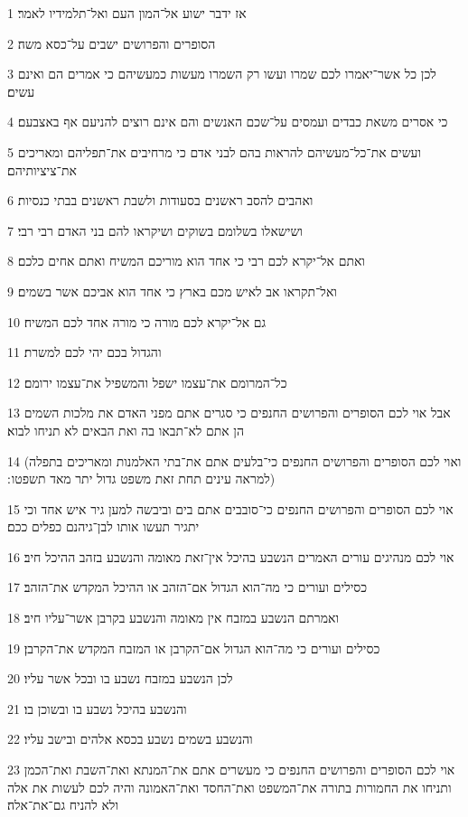 \par 1 אז ידבר ישוע אל־המון העם ואל־תלמידיו לאמר׃
\par 2 הסופרים והפרושים ישבים על־כסא משה׃
\par 3 לכן כל אשר־יאמרו לכם שמרו ועשו רק השמרו מעשות כמעשיהם כי אמרים הם ואינם עשים׃
\par 4 כי אסרים משאת כבדים ועמסים על־שכם האנשים והם אינם רוצים להניעם אף באצבעם׃
\par 5 ועשים את־כל־מעשיהם להראות בהם לבני אדם כי מרחיבים את־תפליהם ומאריכים את־ציציותיהם׃
\par 6 ואהבים להסב ראשנים בסעודות ולשבת ראשנים בבתי כנסיות׃
\par 7 ושישאלו בשלומם בשוקים ושיקראו להם בני האדם רבי רבי׃
\par 8 ואתם אל־יקרא לכם רבי כי אחד הוא מוריכם המשיח ואתם אחים כלכם׃
\par 9 ואל־תקראו אב לאיש מכם בארץ כי אחד הוא אביכם אשר בשמים׃
\par 10 גם אל־יקרא לכם מורה כי מורה אחד לכם המשיח׃
\par 11 והגדול בכם יהי לכם למשרת׃
\par 12 כל־המרומם את־עצמו ישפל והמשפיל את־עצמו ירומם׃
\par 13 אבל אוי לכם הסופרים והפרושים החנפים כי סגרים אתם מפני האדם את מלכות השמים הן אתם לא־תבאו בה ואת הבאים לא תניחו לבוא׃
\par 14 (ואוי לכם הסופרים והפרושים החנפים כי־בלעים אתם את־בתי האלמנות ומאריכים בתפלה למראה עינים תחת זאת משפט גדול יתר מאד תשפטו ׃)
\par 15 אוי לכם הסופרים והפרושים החנפים כי־סובבים אתם בים וביבשה למען גיר איש אחד וכי יתגיר תעשו אותו לבן־גיהנם כפלים ככם׃
\par 16 אוי לכם מנהיגים עורים האמרים הנשבע בהיכל אין־זאת מאומה והנשבע בזהב ההיכל חיב׃
\par 17 כסילים ועורים כי מה־הוא הגדול אם־הזהב או ההיכל המקדש את־הזהב׃
\par 18 ואמרתם הנשבע במזבח אין מאומה והנשבע בקרבן אשר־עליו חיב׃
\par 19 כסילים ועורים כי מה־הוא הגדול אם־הקרבן או המזבח המקדש את־הקרבן׃
\par 20 לכן הנשבע במזבח נשבע בו ובכל אשר עליו׃
\par 21 והנשבע בהיכל נשבע בו ובשוכן בו׃
\par 22 והנשבע בשמים נשבע בכסא אלהים ובישב עליו׃
\par 23 אוי לכם הסופרים והפרושים החנפים כי מעשרים אתם את־המנתא ואת־השבת ואת־הכמן ותניחו את החמורות בתורה את־המשפט ואת־החסד ואת־האמונה והיה לכם לעשות את אלה ולא להניח גם־את־אלה׃
